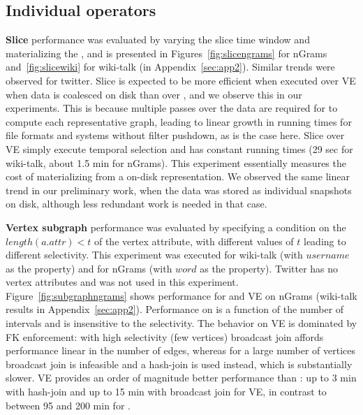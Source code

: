 
\subsection{Individual operators}
\label{sec:exp:ops}

{\bf Slice} performance was evaluated by varying the slice time window
and materializing the \tg, and is presented in
Figures~\ref{fig:slicengrams} for nGrams and~\ref{fig:slicewiki} for
wiki-talk (in Appendix~\ref{sec:app2}).  Similar trends were observed
for twitter.  Slice is expected to be more efficient when executed
over VE when data is coalesced on disk than over \sg, and we observe
this in our experiments.  This is because multiple passes over the
data are required for \sg to compute each representative graph,
leading to linear growth in running times for file formats and systems
without filter pushdown, as is the case here.  Slice over VE simply
execute temporal selection and has constant running times (29 sec for
wiki-talk, about 1.5 min for nGrams). This experiment essentially measures the cost of
materializing \sg from a \ve on-disk representation.  We observed the
same linear trend in our preliminary work, when the data was stored as
individual snapshots on disk, although less redundant work is needed
in that case.

{\bf Vertex subgraph} performance was evaluated by specifying a
condition on the $length(a.attr)<t$ of the vertex attribute, with
different values of $t$ leading to different selectivity.  This
experiment was executed for wiki-talk (with $username$ as the
property) and for nGrams (with $word$ as the property).  Twitter has
no vertex attributes and was not used in this experiment.
Figure~\ref{fig:subgraphngrams} shows performance for \sg and VE on
nGrams (wiki-talk results in Appendix~\ref{sec:app2}).  Performance on
\sg is a function of the number of intervals and is insensitive to the
selectivity.  The behavior on VE is dominated by FK enforcement:
with high selectivity (few vertices) broadcast join affords
performance linear in the number of edges, whereas for a large number
of vertices broadcast join is infeasible and a hash-join is used
instead, which is substantially slower.  VE provides an order of
magnitude better performance than \sg: up to 3 min with hash-join and
up to 15 min with broadcast join for VE, in contrast to between 95 and
200 min for \sg.

